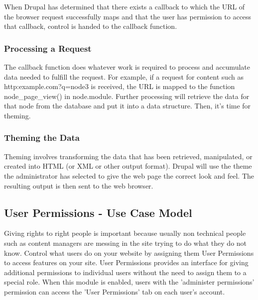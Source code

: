 When Drupal has determined that there exists a callback to which the URL of the browser request successfully maps and that the user has permission to access that callback, control is handed to the callback function.

\subsubsection{Processing a Request}

The callback function does whatever work is required to process and accumulate data needed to fulfill the request. For example, if a request for content such as http:\/\/example.com\/?q=node\/3 is received, the URL is mapped to the function node\_page\_view() in node.module. Further processing will retrieve the data for that node from the database and put it into a data structure. Then, it’s time for theming.

\subsubsection{Theming the Data}

Theming involves transforming the data that has been retrieved, manipulated, or created into HTML (or XML or other output format). Drupal will use the theme the administrator has selected to give the web page the correct look and feel. The resulting output is then sent to the web browser.

\subsection{User Permissions - Use Case Model}

Giving rights to right people is important because usually non technical people such as content managers are messing in the site trying to do what they do not know. Control what users do on your website by assigning them User Permissions to access features on your site. User Permissions provides an interface for giving additional permissions to individual users without the need to assign them to a special role. When this module is enabled, users with the 'administer permissions' permission can access the 'User Permissions' tab on each user's account.

